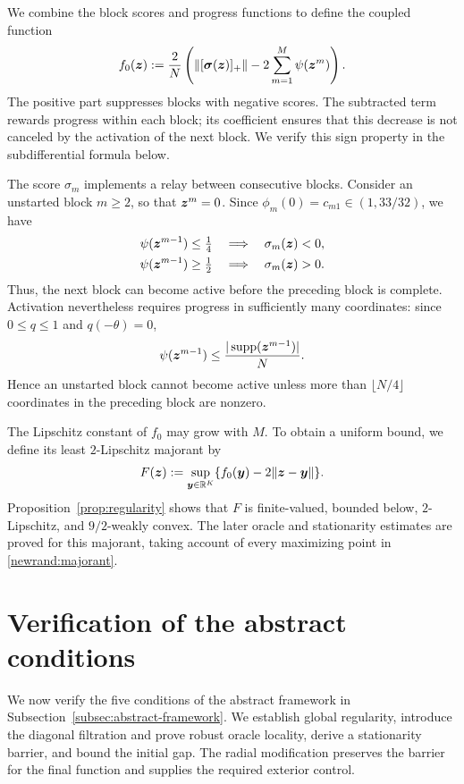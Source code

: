 We combine the block scores and progress functions to define
the coupled function
\begin{equation}
 f_0(\bm{z}):=\frac2N\left(
    \|[\boldsymbol\sigma(\bm{z})]_+\|
    -2\sum_{m=1}^M\psi(\bm{z}^m)\right).
 \label{eq:hard}
\end{equation}
The positive part suppresses blocks with negative scores.
The subtracted term rewards progress within each block; its
coefficient ensures that this decrease is not canceled by the
activation of the next block. We verify this sign property in
the subdifferential formula below.

\begin{remark}
\label{rem:block-relay}
The score $\sigma_m$ implements a relay between consecutive blocks.
Consider an unstarted block $m\ge2$, so that $\bm{z}^m=0$.
Since $\phi_m(0)=c_{m1}\in(1,33/32)$, we have
\[
 \begin{aligned}
 \psi(\bm{z}^{m-1})\le\tfrac14
 &\quad\Longrightarrow\quad \sigma_m(\bm{z})<0,\\
 \psi(\bm{z}^{m-1})\ge\tfrac12
 &\quad\Longrightarrow\quad \sigma_m(\bm{z})>0.
 \end{aligned}
\]
Thus, the next block can become active before the preceding
block is complete. Activation nevertheless requires progress
in sufficiently many coordinates: since $0\le q\le1$ and
$q(-\theta)=0$,
\[
 \psi(\bm{z}^{m-1})
 \le\frac{|\operatorname{supp}(\bm{z}^{m-1})|}{N}.
\]
Hence an unstarted block cannot become active unless more than
$\lfloor N/4\rfloor$ coordinates in the preceding block are nonzero.
\end{remark}

The Lipschitz constant of $f_0$ may grow with $M$.
To obtain a uniform bound, we define its least $2$-Lipschitz
majorant by
\begin{equation}
 F(\bm{z}):=\sup_{\bm{y}\in{\mathbb{R}}^K}
       \{f_0(\bm{y})-2\|\bm{z}-\bm{y}\|\}.
 \label{newrand:majorant}
\end{equation}
Proposition~\ref{prop:regularity} shows that $F$ is finite-valued,
bounded below, $2$-Lipschitz, and $9/2$-weakly convex.
The later oracle and stationarity estimates are proved for
this majorant, taking account of every maximizing point in
\eqref{newrand:majorant}.

\endgroup


\begingroup
\color{black}
\section{Verification of the abstract conditions}
\label{sec:verification}
We now verify the five conditions of the abstract framework in
Subsection~\ref{subsec:abstract-framework}. We establish global regularity,
introduce the diagonal filtration and prove robust oracle locality,
derive a stationarity barrier, and bound the initial gap.
The radial modification preserves the barrier for the final function
and supplies the required exterior control.

